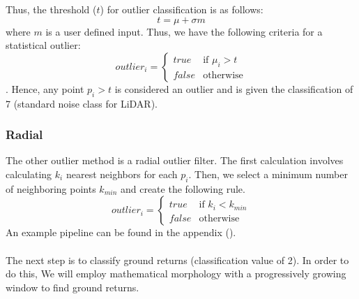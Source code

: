 \documentclass[11pt]{article}
\theoremstyle{definition}
\begin{document}
Thus, the threshold ($t$) for outlier classification is as follows:
\begin{equation}\label{eqn:threshold}
t=\mu+\sigma m
\end{equation}
where $m$ is a user defined input.  Thus, we have the following criteria for a statistical outlier:
\begin{equation}\label{eqn:stat_rule}
outlier_{i}=\begin{cases}
true & \text{if $\mu_{i}>t$}\\
false & \text{otherwise}
\end{cases}
\end{equation}.  
Hence, any point $p_i > t$ is considered an outlier and is given the classification of 7 (standard noise class for LiDAR).
\subsubsection{Radial}\label{subsub:radial}
The other outlier method is a radial outlier filter.  The first calculation involves calculating $k_i$ nearest neighbors for each $p_i$.  Then, we select a minimum number of neighboring points $k_{min}$ and create the following rule.  
\begin{equation}\label{eqn:rad_rule}
outlier_{i}=\begin{cases}
true & \text{if $k_{i}<k_{min}$}\\
false & \text{otherwise}
\end{cases}
\end{equation}
An example pipeline can be found in the appendix ().\\\\
The next step is to classify ground returns (classification value of 2).  In order to do this, We will employ mathematical morphology with a progressively growing window to find ground returns.  
\end{document}
